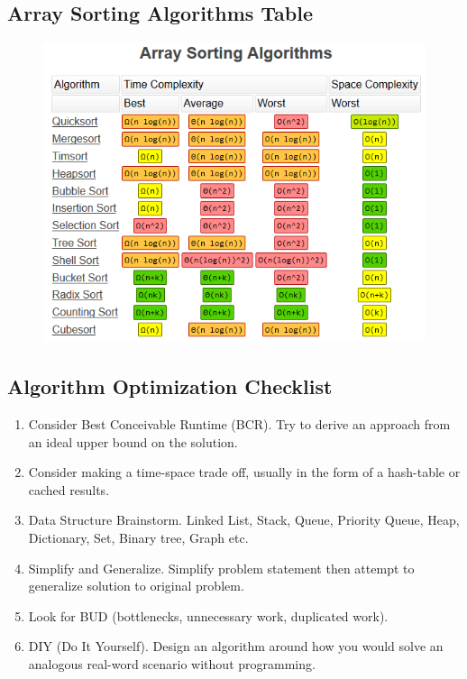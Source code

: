 \documentclass{article}
\begin{document}
\subsection{Array Sorting Algorithms Table}
\begin{figure}[h]
    \centering
    \includegraphics[width=13cm]{Array_sorting_algorithms.png}
\end{figure}


\subsection{Algorithm Optimization Checklist}
\begin{enumerate}
    \item Consider Best Conceivable Runtime (BCR). Try to derive an approach from an ideal upper bound on the solution.
    \item Consider making a time-space trade off, usually in the form of a hash-table or cached results.
    \item Data Structure Brainstorm. Linked List, Stack, Queue, Priority Queue, Heap, Dictionary, Set, Binary tree, Graph etc.
    \item Simplify and Generalize. Simplify problem statement then attempt to generalize solution to original problem.
    \item Look for BUD (bottlenecks, unnecessary work, duplicated work).
    \item DIY (Do It Yourself). Design an algorithm around how you would solve an analogous real-word scenario without programming.
\end{enumerate}
\end{document}

